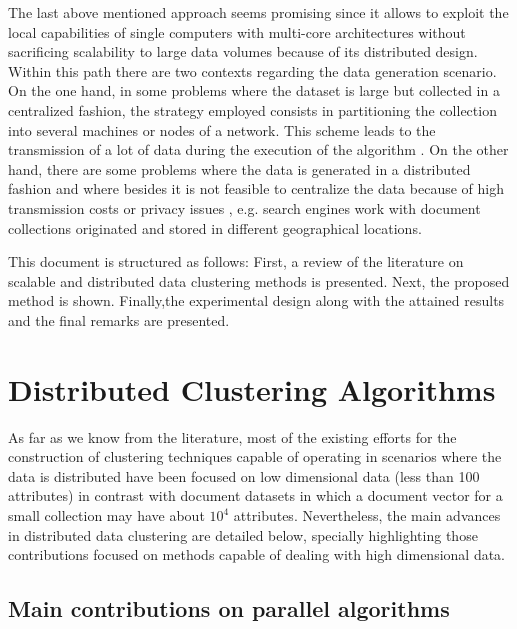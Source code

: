 \documentclass[a4paper]{article}
\begin{document}
The last above mentioned approach seems promising since it allows to exploit the local capabilities of single computers with multi-core architectures without sacrificing scalability to large data volumes because of its distributed design. Within this path there are two contexts regarding the data generation scenario. On the one hand, in some problems where the dataset is large but collected in a centralized fashion, the strategy employed consists in partitioning the collection into several machines or nodes of a network. This scheme leads to the transmission of a lot of data during the execution of the algorithm \cite{N15}. On the other hand, there are some problems where the data is generated in a distributed fashion and where besides it is not feasible to centralize the data because of high transmission costs or privacy issues \cite{JW05,LHLX12}, e.g. search engines work with document collections originated and stored in different geographical locations.

This document is structured as follows: First, a review of the literature on scalable and distributed data clustering methods is presented. Next, the proposed method is shown. Finally,the experimental design along with the attained results and the final remarks are presented. 

\section{Distributed Clustering Algorithms}
As far as we know from the literature, most of the existing efforts for the construction of clustering techniques capable of operating in scenarios where the data is distributed have been focused on low dimensional data (less than 100 attributes) in contrast with document datasets in which a document vector for a small collection may have about $10^4$ attributes. Nevertheless, the main advances in distributed data clustering are detailed below, specially highlighting those contributions focused on methods capable of dealing with high dimensional data.


\subsection{Main contributions on parallel algorithms}
\end{document}
